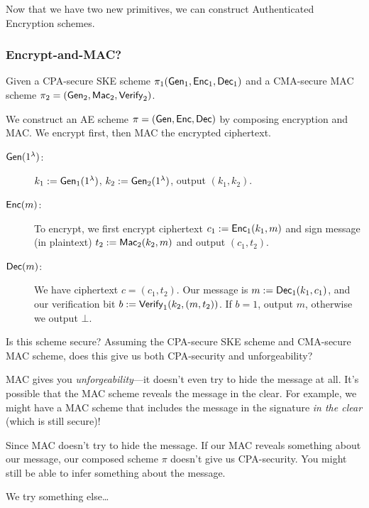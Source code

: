 
Now that we have two new primitives, we can construct Authenticated Encryption schemes.

\subsubsection{Encrypt-and-MAC?}
Given a CPA-secure SKE scheme $\pi_1(\operatorname{\mathsf{Gen}}_1, \operatorname{\mathsf{Enc}}_1, \operatorname{\mathsf{Dec}}_1)$ and a CMA-secure MAC scheme $\pi_2 = (\operatorname{\mathsf{Gen}}_2, \operatorname{\mathsf{Mac}}_2, \operatorname{\mathsf{Verify}}_2)$.

We construct an AE scheme $\pi = (\operatorname{\mathsf{Gen}}, \operatorname{\mathsf{Enc}}, \operatorname{\mathsf{Dec}})$ by composing encryption and MAC. We encrypt first, then MAC the encrypted ciphertext.


\begin{description}
    \item[$\operatorname{\mathsf{Gen}}(1^\lambda)$:] $k_1:=\operatorname{\mathsf{Gen}}_1(1^\lambda)$, $k_2:=\operatorname{\mathsf{Gen}}_2(1^\lambda)$, output $(k_1, k_2)$.

    \item[$\operatorname{\mathsf{Enc}}(m)$:] To encrypt, we first encrypt ciphertext $c_1 := \operatorname{\mathsf{Enc}}_1(k_1, m)$ and sign message (in plaintext) $t_2 := \operatorname{\mathsf{Mac}}_2(k_2, m)$ and output $(c_1, t_2)$.

    \item[$\operatorname{\mathsf{Dec}}(m)$:] We have ciphertext $c = (c_1, t_2)$. Our message is $m:=\operatorname{\mathsf{Dec}}_1(k_1, c_1)$, and our verification bit $b := \operatorname{\mathsf{Verify}}_1(k_2, (m, t_2))$. If $b = 1$, output $m$, otherwise we output $\bot$.
\end{description}

\begin{ques*}
    Is this scheme secure? Assuming the CPA-secure SKE scheme and CMA-secure MAC scheme, does this give us both CPA-security and unforgeability?
\end{ques*}

MAC gives you \emph{unforgeability}---it doesn't even try to hide the message at all. It's possible that the MAC scheme reveals the message in the clear. For example, we might have a MAC scheme that includes the message in the signature \emph{in the clear} (which is still secure)!

Since MAC doesn't try to hide the message. If our MAC reveals something about our message, our composed scheme $\pi$ doesn't give us CPA-security. You might still be able to infer something about the message.

We try something else\dots

